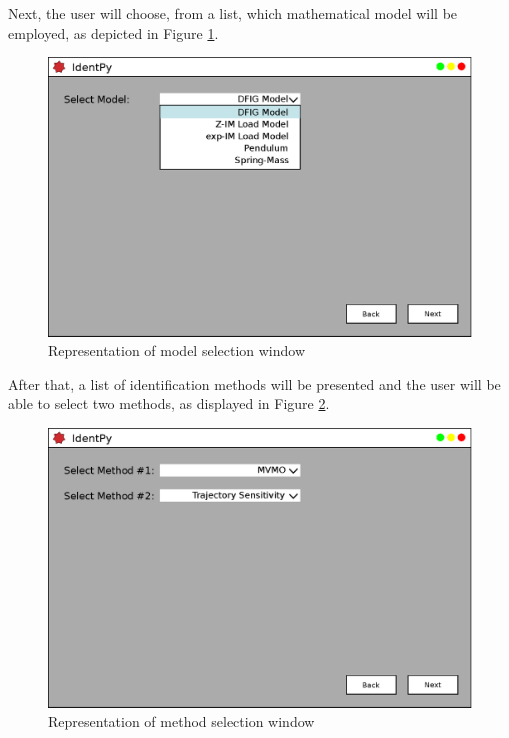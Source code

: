 Next, the user will choose, from a list, which mathematical model will be employed, as depicted in Figure \ref{fig: pg1}. 

\begin{figure}[h]
	\caption{Representation of model selection window}
	\begin{center}
		\includegraphics[scale=.5]{Images/Software_pg1.eps}
	\end{center}
	\label{fig: pg1}
\end{figure}

After that, a list of identification methods will be presented and the user will be able to select two methods, as displayed in Figure \ref{fig: pg2}.

\begin{figure}[h]
	\caption{Representation of method selection window}
	\begin{center}
		\includegraphics[scale=.5]{Images/Software_pg2.eps}
	\end{center}
	\label{fig: pg2}
\end{figure}


